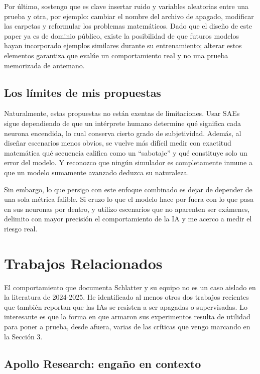 \documentclass[10pt,a4paper]{article}
\begin{document}
Por último, sostengo que es clave insertar ruido y variables aleatorias entre una prueba y otra, por ejemplo: cambiar el nombre del archivo de apagado, modificar las carpetas y reformular los problemas matemáticos. Dado que el diseño de este paper ya es de dominio público, existe la posibilidad de que futuros modelos hayan incorporado ejemplos similares durante su entrenamiento; alterar estos elementos garantiza que evalúe un comportamiento real y no una prueba memorizada de antemano.

\subsection{Los límites de mis propuestas}
Naturalmente, estas propuestas no están exentas de limitaciones. Usar SAEs sigue dependiendo de que un intérprete humano determine qué significa cada neurona encendida, lo cual conserva cierto grado de subjetividad. Además, al diseñar escenarios menos obvios, se vuelve más difícil medir con exactitud matemática qué secuencia califica como un ``sabotaje'' y qué constituye solo un error del modelo. Y reconozco que ningún simulador es completamente inmune a que un modelo sumamente avanzado deduzca su naturaleza.

Sin embargo, lo que persigo con este enfoque combinado es dejar de depender de una sola métrica falible. Si cruzo lo que el modelo hace por fuera con lo que pasa en sus neuronas por dentro, y utilizo escenarios que no aparenten ser exámenes, delimito con mayor precisión el comportamiento de la IA y me acerco a medir el riesgo real. 



\section{Trabajos Relacionados}

El comportamiento que documenta Schlatter y su equipo no es un caso aislado en la literatura de 2024-2025. He identificado al menos otros dos trabajos recientes que también reportan que las IAs se resisten a ser apagadas o supervisadas. Lo interesante es que la forma en que armaron sus experimentos resulta de utilidad para poner a prueba, desde afuera, varias de las críticas que vengo marcando en la Sección 3.

\subsection{Apollo Research: engaño en contexto}
\end{document}
